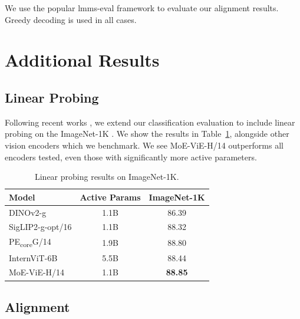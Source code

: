 \documentclass[runningheads]{llncs}
\begin{document}
We use the popular lmms-eval framework \cite{lmms_eval} to evaluate our alignment results. Greedy decoding is used in all cases.

\section{Additional Results}
\label{appx_additional_results}

\subsection{Linear Probing}
Following recent works \cite{pe,dino,internvl}, we extend our classification evaluation to include linear probing on the ImageNet-1K \cite{imagenet1k}. We show the results in Table~\ref{linear_probing_imagenet1k}, alongside other vision encoders which we benchmark. We see MoE-ViE-H/14 outperforms all encoders tested, even those with significantly more active parameters.

\begin{table}[htbp]
\centering
\caption{Linear probing results on ImageNet-1K.}
\label{linear_probing_imagenet1k}
\fontsize{6.5}{8}\selectfont
\setlength{\tabcolsep}{3pt}
\newcommand{\gc}{\cellcolor{gray!10}}

\begin{tabular}{l c c}
\toprule
\textbf{Model} & \textbf{Active Params} & \textbf{ImageNet-1K} \\
\midrule
DINOv2-g \cite{dinov2}        & 1.1B & 86.39 \\
SigLIP2-g-opt/16 \cite{siglip2} & 1.1B & 88.32 \\
PE\textsubscript{core}G/14 \cite{pe}        & 1.9B & 88.80 \\
InternViT-6B \cite{internvl}      & 5.5B & 88.44 \\
MoE-ViE-H/14    & 1.1B   & \textbf{88.85} \\
\bottomrule
\end{tabular}
\end{table}

\subsection{Alignment}
\label{appx_alignment_results}
\end{document}
